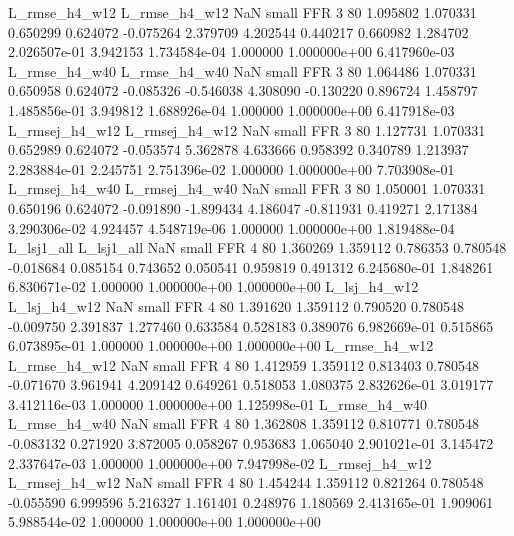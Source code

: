  L_rmse_h4_w12  L_rmse_h4_w12                   NaN      small      FFR                 3 80 1.095802       1.070331 0.650299       0.624072   -0.075264      2.379709      4.202544     0.440217       0.660982  1.284702 2.026507e-01     3.942153   1.734584e-04            1.000000    1.000000e+00        6.417960e-03
 L_rmse_h4_w40  L_rmse_h4_w40                   NaN      small      FFR                 3 80 1.064486       1.070331 0.650958       0.624072   -0.085326     -0.546038      4.308090    -0.130220       0.896724  1.458797 1.485856e-01     3.949812   1.688926e-04            1.000000    1.000000e+00        6.417918e-03
L_rmsej_h4_w12 L_rmsej_h4_w12                   NaN      small      FFR                 3 80 1.127731       1.070331 0.652989       0.624072   -0.053574      5.362878      4.633666     0.958392       0.340789  1.213937 2.283884e-01     2.245751   2.751396e-02            1.000000    1.000000e+00        7.703908e-01
L_rmsej_h4_w40 L_rmsej_h4_w40                   NaN      small      FFR                 3 80 1.050001       1.070331 0.650196       0.624072   -0.091890     -1.899434      4.186047    -0.811931       0.419271  2.171384 3.290306e-02     4.924457   4.548719e-06            1.000000    1.000000e+00        1.819488e-04
    L_lsj1_all     L_lsj1_all                   NaN      small      FFR                 4 80 1.360269       1.359112 0.786353       0.780548   -0.018684      0.085154      0.743652     0.050541       0.959819  0.491312 6.245680e-01     1.848261   6.830671e-02            1.000000    1.000000e+00        1.000000e+00
  L_lsj_h4_w12   L_lsj_h4_w12                   NaN      small      FFR                 4 80 1.391620       1.359112 0.790520       0.780548   -0.009750      2.391837      1.277460     0.633584       0.528183  0.389076 6.982669e-01     0.515865   6.073895e-01            1.000000    1.000000e+00        1.000000e+00
 L_rmse_h4_w12  L_rmse_h4_w12                   NaN      small      FFR                 4 80 1.412959       1.359112 0.813403       0.780548   -0.071670      3.961941      4.209142     0.649261       0.518053  1.080375 2.832626e-01     3.019177   3.412116e-03            1.000000    1.000000e+00        1.125998e-01
 L_rmse_h4_w40  L_rmse_h4_w40                   NaN      small      FFR                 4 80 1.362808       1.359112 0.810771       0.780548   -0.083132      0.271920      3.872005     0.058267       0.953683  1.065040 2.901021e-01     3.145472   2.337647e-03            1.000000    1.000000e+00        7.947998e-02
L_rmsej_h4_w12 L_rmsej_h4_w12                   NaN      small      FFR                 4 80 1.454244       1.359112 0.821264       0.780548   -0.055590      6.999596      5.216327     1.161401       0.248976  1.180569 2.413165e-01     1.909061   5.988544e-02            1.000000    1.000000e+00        1.000000e+00

